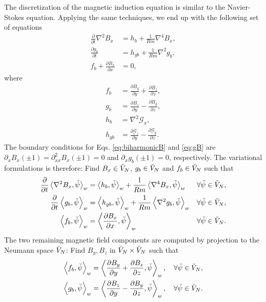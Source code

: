 The discretization of the magnetic induction equation is similar to the Navier-Stokes equation. Applying the same techniques, we end up with the following set of equations
\begin{align}
\frac{\partial}{\partial t} \nabla^2 B_x &= h_b + \frac{1}{Rm} \nabla^4 B_x, 
\label{eq:biharmonicB} \\
\frac{\partial g_b}{\partial t} &= h_{gb} + \frac{1}{Rm} \nabla^2 g_b, \label{eq:gB} \\
f_b + \frac{\partial B_x}{\partial x} &= 0, \label{eq:fb}
\end{align}
where
\begin{align}
f_b &= \frac{\partial B_y}{\partial y} + \frac{\partial B_z}{\partial z}, \\
g_b &= \frac{\partial B_z}{\partial y} - \frac{\partial B_y}{\partial z}, \\
h_b &= \nabla^2 \mathcal{G}_x, \label{eq:hbB}\\
h_{gb} &= \frac{\partial \mathcal{G}_z}{\partial y} - \frac{\partial 
\mathcal{G}_y}{\partial z}.\label{eq:hgB}
\end{align}
The boundary conditions for Eqs. \ref{eq:biharmonicB} and \ref{eq:gB} are $\partial_x B_x(\pm 1) = \partial^{2}_{xx} B_x(\pm 1) = 0$ and $ \partial_{x} g_b(\pm 1) = 0$, respectively. The variational formulations is therefore: Find ${B_x} \in \tilde{V}_N$, ${g_b} \in \breve{V}_N$ and ${f_b} \in \breve{V}_N$ such that
\begin{align}
	\frac{\partial }{\partial t} \left< \nabla^2 B_x, \tilde{\psi}\right>_w &= 
	\left<h_b, \tilde{\psi} \right>_w + \frac{1}{Rm} \left<\nabla^4 B_x, \tilde{\psi}\right>_w 
	&\forall \tilde{\psi} \in \tilde{V}_N, \label{eq:b1} \\
	\frac{\partial}{\partial t}\left<g_b, \breve{\psi}\right>_w &= \left<h_{gb}, 
	\breve{\psi}\right>_w + \frac{1}{Rm} 
	\left<\nabla^2 g_b, \breve{\psi}\right>_w &\forall \breve{\psi} \in \breve{V}_N ,
	\label{eq:gb1} \\
	\left<f_b, \breve{\psi}\right>_w &= \left<\frac{\partial B_x}{\partial x}, 
	\breve{\psi}\right>_w &\forall \breve{\psi} \in \breve{V}_N. \label{eq:fb1}
\end{align}
The two remaining magnetic field components are computed by projection to the 
Neumann space $\breve{V}_N$: Find 
${B_y}, {B_z}$ in $\breve{V}_N \times \breve{V}_N$ such that
\begin{align}
\left<f_b, \breve{\psi}\right>_w &= \left<\frac{\partial B_y}{\partial y} + 
\frac{\partial B_z}{\partial z}, \breve{\psi}\right>_w, \, &\forall \breve{\psi} \in 
\breve{V}_N, \label{eq:fb2} \\
\left<g_b, \breve{\psi}\right>_w &= \left<\frac{\partial B_z}{\partial y}  - 
\frac{\partial B_y}{\partial z}, \breve{\psi}\right>_w, \, &\forall \breve{\psi} \in 
\breve{V}_N. \label{eq:gb2}
\end{align}
